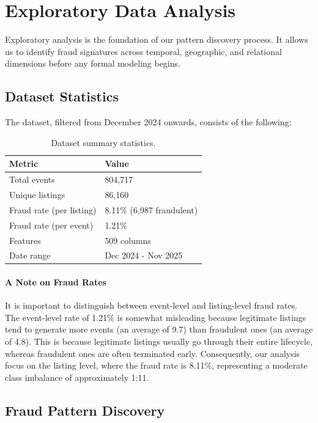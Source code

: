 \section{Exploratory Data Analysis}
\label{sec:3_3}

Exploratory analysis is the foundation of our pattern discovery process. It allows us to identify fraud signatures across temporal, geographic, and relational dimensions before any formal modeling begins.

\subsection{Dataset Statistics}

The dataset, filtered from December 2024 onwards, consists of the following:

\begin{table}[h]
\centering
\caption{Dataset summary statistics.}
\begin{tabular}{ll}
\hline
Metric & Value \\
\hline
Total events & 804,717 \\
Unique listings & 86,160 \\
Fraud rate (per listing) & 8.11\% (6,987 fraudulent) \\
Fraud rate (per event) & 1.21\% \\
Features & 509 columns \\
Date range & Dec 2024 - Nov 2025 \\
\hline
\end{tabular}
\end{table}

\paragraph{A Note on Fraud Rates}
It is important to distinguish between event-level and listing-level fraud rates. The event-level rate of 1.21\% is somewhat misleading because legitimate listings tend to generate more events (an average of 9.7) than fraudulent ones (an average of 4.8). This is because legitimate listings usually go through their entire lifecycle, whereas fraudulent ones are often terminated early. Consequently, our analysis focus on the listing level, where the fraud rate is 8.11\%, representing a moderate class imbalance of approximately 1:11.

\subsection{Fraud Pattern Discovery}

